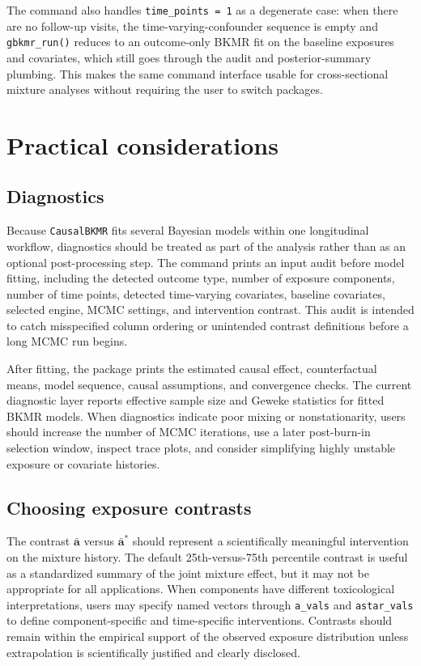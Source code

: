 \documentclass[11pt]{article}
\newcommand{\pkg}[1]{\texttt{#1}}
\newcommand{\code}[1]{\texttt{#1}}
\begin{document}
The command also handles \code{time\_points = 1} as a degenerate case: when there are no follow-up visits, the time-varying-confounder sequence is empty and \code{gbkmr\_run()} reduces to an outcome-only BKMR fit on the baseline exposures and covariates, which still goes through the audit and posterior-summary plumbing. This makes the same command interface usable for cross-sectional mixture analyses without requiring the user to switch packages.

\section*{Practical considerations}
\label{sec:practical}

\subsection*{Diagnostics}
Because \pkg{CausalBKMR} fits several Bayesian models within one longitudinal workflow, diagnostics should be treated as part of the analysis rather than as an optional post-processing step. The command prints an input audit before model fitting, including the detected outcome type, number of exposure components, number of time points, detected time-varying covariates, baseline covariates, selected engine, MCMC settings, and intervention contrast. This audit is intended to catch misspecified column ordering or unintended contrast definitions before a long MCMC run begins.

After fitting, the package prints the estimated causal effect, counterfactual means, model sequence, causal assumptions, and convergence checks. The current diagnostic layer reports effective sample size and Geweke statistics for fitted BKMR models. When diagnostics indicate poor mixing or nonstationarity, users should increase the number of MCMC iterations, use a later post-burn-in selection window, inspect trace plots, and consider simplifying highly unstable exposure or covariate histories.

\subsection*{Choosing exposure contrasts}
The contrast $\bar{\mathbf{a}}$ versus $\bar{\mathbf{a}}^*$ should represent a scientifically meaningful intervention on the mixture history. The default 25th-versus-75th percentile contrast is useful as a standardized summary of the joint mixture effect, but it may not be appropriate for all applications. When components have different toxicological interpretations, users may specify named vectors through \code{a\_vals} and \code{astar\_vals} to define component-specific and time-specific interventions. Contrasts should remain within the empirical support of the observed exposure distribution unless extrapolation is scientifically justified and clearly disclosed.
\end{document}
